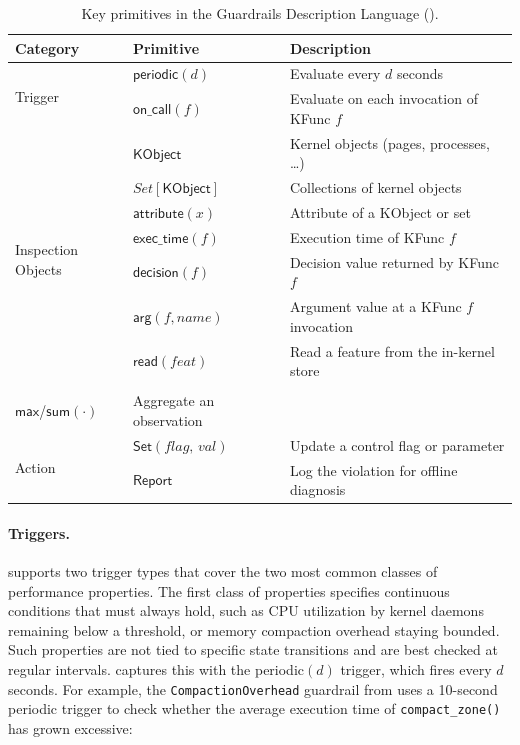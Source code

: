 \begin{table}[t]
\centering
\small
\setlength{\tabcolsep}{4pt}
\begin{tabular}{p{1.4cm}p{2cm}p{4.4cm}}
\toprule
\textbf{Category} & \textbf{Primitive} & \textbf{Description} \\
\midrule
\multirow{2}{*}{Trigger}
  & $\textsf{periodic}(d)$ & Evaluate every $d$ seconds \\
  & $\textsf{on\_call}(f)$ & Evaluate on each invocation of \textsf{KFunc} $f$ \\
\midrule
\multirow{8}{1.4cm}{Inspection Objects}
  & $\textsf{KObject}$ & Kernel objects (pages, processes, \ldots) \\
  & $Set[\textsf{KObject}]$ & Collections of kernel objects \\
  & $\textsf{attribute}(x)$ & Attribute of a \textsf{KObject} or set \\
  & $\textsf{exec\_time}(f)$ & Execution time of \textsf{KFunc} $f$ \\
  & $\textsf{decision}(f)$ & Decision value returned by \textsf{KFunc} $f$ \\
  & $\textsf{arg}(f, \mathit{name})$ & Argument value at a \textsf{KFunc} $f$ invocation \\
  & $\textsf{read}(\mathit{feat})$ & Read a feature from the in-kernel store \\
  & \makecell[l]{$\textsf{avg}$/$\textsf{min}$/\\$\textsf{max}$/$\textsf{sum}(\cdot)$} & Aggregate an observation \\
\midrule
\multirow{2}{*}{Action}
  & $\textsf{Set}(\mathit{flag},\,\mathit{val})$ & Update a control flag or parameter \\
  & $\textsf{Report}$ & Log the violation for offline diagnosis \\
\bottomrule
\end{tabular}
\caption{Key primitives in the Guardrails Description Language (\lang).}
\label{tab:gdl-primitives}
\end{table}


\paragraph{Triggers.}
\lang supports two trigger types that cover the two most common classes of performance properties.
The first class of properties specifies continuous conditions that must always hold, such as CPU utilization by kernel daemons remaining below a threshold, or memory compaction overhead staying bounded.
Such properties are not tied to specific state transitions and are best checked at regular intervals.
\lang captures this with the {\sf periodic}$(d)$ trigger, which fires every $d$ seconds.
For example, the {\tt CompactionOverhead} guardrail from  uses a 10-second periodic trigger to check whether the average execution time of {\tt compact\_zone()} has grown excessive:

